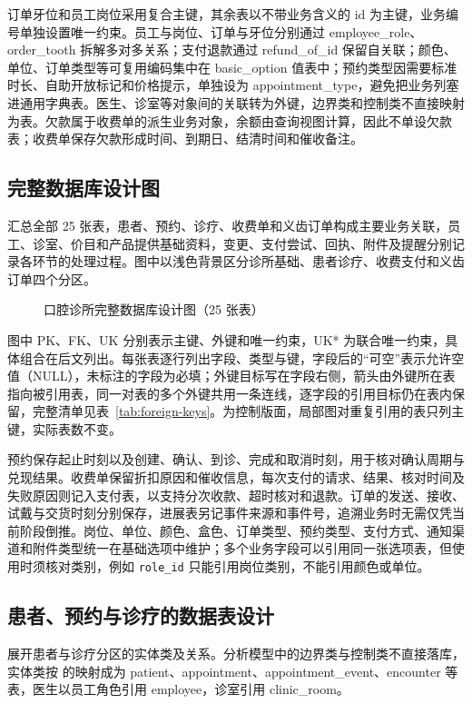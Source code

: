 订单牙位和员工岗位采用复合主键，其余表以不带业务含义的 id 为主键，业务编号单独设置唯一约束。员工与岗位、订单与牙位分别通过 employee\_role、order\_tooth 拆解多对多关系；支付退款通过 refund\_of\_id 保留自关联；颜色、单位、订单类型等可复用编码集中在 basic\_option 值表中；预约类型因需要标准时长、自助开放标记和价格提示，单独设为 appointment\_type，避免把业务列塞进通用字典表。医生、诊室等对象间的关联转为外键，边界类和控制类不直接映射为表。欠款属于收费单的派生业务对象，余额由查询视图计算，因此不单设欠款表；收费单保存欠款形成时间、到期日、结清时间和催收备注。

\clearpage
\subsection{完整数据库设计图}
 汇总全部 25 张表，患者、预约、诊疗、收费单和义齿订单构成主要业务关联，员工、诊室、价目和产品提供基础资料，变更、支付尝试、回执、附件及提醒分别记录各环节的处理过程。图中以浅色背景区分诊所基础、患者诊疗、收费支付和义齿订单四个分区。

\begin{figure}[H]\centering
{}
\caption{口腔诊所完整数据库设计图（25 张表）}\label{fig:erd-full}
\end{figure}

图中 PK、FK、UK 分别表示主键、外键和唯一约束，UK* 为联合唯一约束，具体组合在后文列出。每张表逐行列出字段、类型与键，字段后的“可空”表示允许空值（NULL），未标注的字段为必填；外键目标写在字段右侧，箭头由外键所在表指向被引用表，同一对表的多个外键共用一条连线，逐字段的引用目标仍在表内保留，完整清单见表~\ref{tab:foreign-keys}。为控制版面，局部图对重复引用的表只列主键，实际表数不变。

预约保存起止时刻以及创建、确认、到诊、完成和取消时刻，用于核对确认周期与兑现结果。收费单保留折扣原因和催收信息，每次支付的请求、结果、核对时间及失败原因则记入支付表，以支持分次收款、超时核对和退款。订单的发送、接收、试戴与交货时刻分别保存，进展表另记事件来源和事件号，追溯业务时无需仅凭当前阶段倒推。岗位、单位、颜色、盒色、订单类型、预约类型、支付方式、通知渠道和附件类型统一在基础选项中维护；多个业务字段可以引用同一张选项表，但使用时须核对类别，例如 \texttt{role\_id} 只能引用岗位类别，不能引用颜色或单位。

\clearpage
\subsection{患者、预约与诊疗的数据表设计}
 展开患者与诊疗分区的实体类及关系。分析模型中的边界类与控制类不直接落库，实体类按  的映射成为 patient、appointment、appointment\_event、encounter 等表，医生以员工角色引用 employee，诊室引用 clinic\_room。

